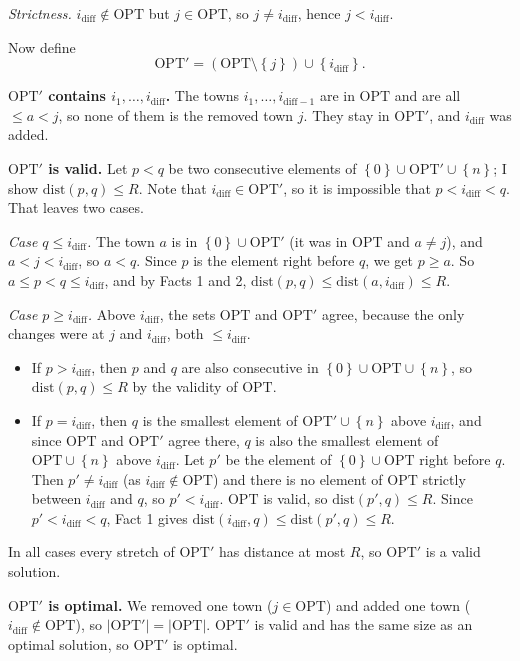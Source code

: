 \documentclass[11pt]{article}
\newcommand{\set}[1]{\left\{#1\right\}}
\newcommand{\abs}[1]{\left|#1\right|}
\newcommand{\OPT}{\mathrm{OPT}}
\begin{document}
\emph{Strictness.} $i_{\text{diff}} \notin \OPT$ but $j \in \OPT$, so $j \ne i_{\text{diff}}$, hence $j < i_{\text{diff}}$.

Now define
\[
  \OPT' = (\OPT \setminus \set{j}) \cup \set{i_{\text{diff}}} .
\]

\textbf{$\OPT'$ contains $i_1,\dots,i_{\text{diff}}$.}
The towns $i_1,\dots,i_{\text{diff}-1}$ are in $\OPT$ and are all $\le a < j$, so none of them is the removed town $j$.
They stay in $\OPT'$, and $i_{\text{diff}}$ was added.

\textbf{$\OPT'$ is valid.}
Let $p < q$ be two consecutive elements of $\set{0} \cup \OPT' \cup \set{n}$; I show $\mathrm{dist}(p,q) \le R$.
Note that $i_{\text{diff}} \in \OPT'$, so it is impossible that $p < i_{\text{diff}} < q$.
That leaves two cases.

\emph{Case $q \le i_{\text{diff}}$.}
The town $a$ is in $\set{0}\cup\OPT'$ (it was in $\OPT$ and $a \ne j$), and $a < j < i_{\text{diff}}$, so $a < q$.
Since $p$ is the element right before $q$, we get $p \ge a$.
So $a \le p < q \le i_{\text{diff}}$, and by Facts 1 and 2, $\mathrm{dist}(p,q) \le \mathrm{dist}(a,i_{\text{diff}}) \le R$.

\emph{Case $p \ge i_{\text{diff}}$.}
Above $i_{\text{diff}}$, the sets $\OPT$ and $\OPT'$ agree, because the only changes were at $j$ and $i_{\text{diff}}$, both $\le i_{\text{diff}}$.
\begin{itemize}
  \item If $p > i_{\text{diff}}$, then $p$ and $q$ are also consecutive in $\set{0}\cup\OPT\cup\set{n}$, so $\mathrm{dist}(p,q) \le R$ by the validity of $\OPT$.
  \item If $p = i_{\text{diff}}$, then $q$ is the smallest element of $\OPT' \cup \set{n}$ above $i_{\text{diff}}$, and since $\OPT$ and $\OPT'$ agree there, $q$ is also the smallest element of $\OPT \cup \set{n}$ above $i_{\text{diff}}$.
  Let $p'$ be the element of $\set{0}\cup\OPT$ right before $q$.
  Then $p' \ne i_{\text{diff}}$ (as $i_{\text{diff}} \notin \OPT$) and there is no element of $\OPT$ strictly between $i_{\text{diff}}$ and $q$, so $p' < i_{\text{diff}}$.
  $\OPT$ is valid, so $\mathrm{dist}(p',q) \le R$.
  Since $p' < i_{\text{diff}} < q$, Fact 1 gives $\mathrm{dist}(i_{\text{diff}},q) \le \mathrm{dist}(p',q) \le R$.
\end{itemize}
In all cases every stretch of $\OPT'$ has distance at most $R$, so $\OPT'$ is a valid solution.

\textbf{$\OPT'$ is optimal.}
We removed one town ($j \in \OPT$) and added one town ($i_{\text{diff}} \notin \OPT$), so $\abs{\OPT'} = \abs{\OPT}$.
$\OPT'$ is valid and has the same size as an optimal solution, so $\OPT'$ is optimal.
    
\end{document}
